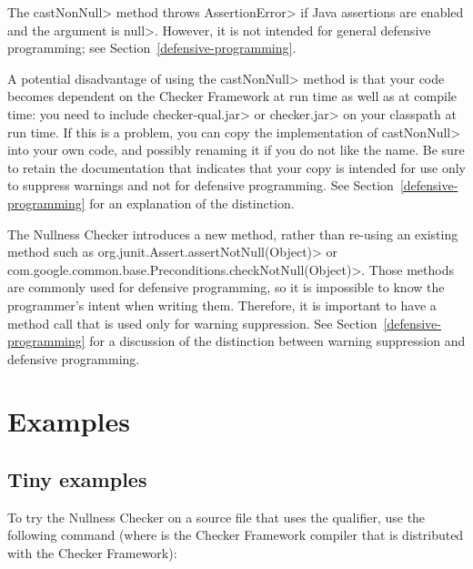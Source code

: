   The \<castNonNull> method throws \<AssertionError> if Java assertions are enabled and
  the argument is \<null>.  However, it is not intended for general defensive
  programming; see Section~\ref{defensive-programming}.

  A potential disadvantage of using the \<castNonNull> method is that your
  code becomes dependent on the Checker Framework at run time as well as at
  compile time:  you need to include \<checker-qual.jar>
  or \<checker.jar> on your classpath at run time.
  If this is a problem, you can copy the implementation of
  \<castNonNull> into your own code, and possibly renaming it if you do not
  like the name.  Be sure to retain the documentation that indicates that
  your copy is intended for use only to suppress warnings and not for
  defensive programming.  See Section~\ref{defensive-programming} for an
  explanation of the distinction.

\begin{sloppypar}
The Nullness Checker introduces a new method, rather than re-using an
existing method such as \<org.junit.Assert.assertNotNull(Object)> or
\<com.google.common.base.Preconditions.checkNotNull(Object)>.  Those
methods are commonly used for defensive programming, so it is impossible to
know the programmer's intent when writing them.  Therefore, it is important to
have a method call that is used only for warning suppression.  See
Section~\ref{defensive-programming} for a discussion of
the distinction between warning suppression and defensive programming.
\end{sloppypar}


\section{Examples\label{nullness-example}}

\subsection{Tiny examples\label{nullness-tiny-examples}}

To try the Nullness Checker on a source file that uses the  qualifier,
use the following command (where  is the Checker Framework compiler that
is distributed with the Checker Framework):

